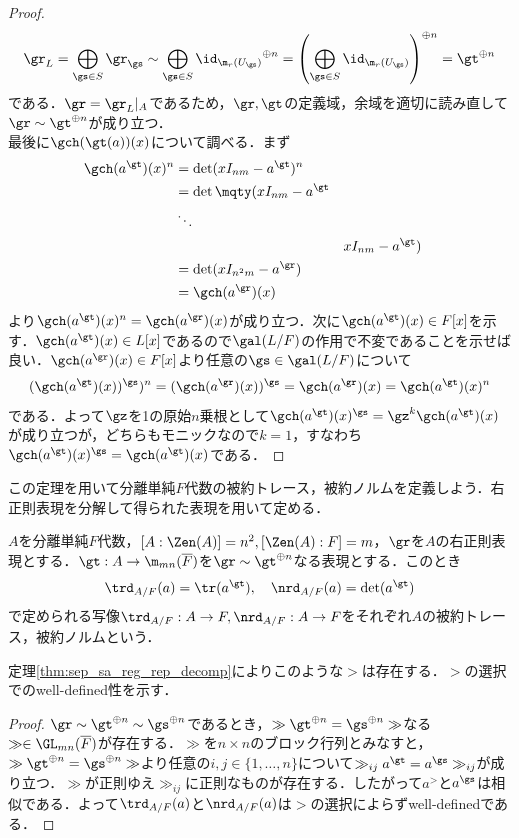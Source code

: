 \documentclass[a4paper,11pt]{jsarticle}
\begin{document}
\begin{proof}
  \[
    \gr_L=\bigoplus_{\gs\in S}\gr_\gs\sim\bigoplus_{\gs\in S} {\id_{\m_r(U_\gs)}}^{\oplus n}=\left(\bigoplus_{\gs\in S}\id_{\m_r(U_\gs)}\right)^{\oplus n}=\gt^{\oplus n}
  \]
  である．$\gr=\gr_L|_A$であるため，$\gr,\gt$の定義域，余域を適切に読み直して$\gr\sim \gt^{\oplus n}$が成り立つ．\\
  最後に$\gch(\gt(a))(x)$について調べる．まず
  \begin{align*}
    \gch(a^\gt)(x)^n & =\det(xI_{nm} - a^\gt)^n          \\
                     & =\det\mqty(xI_{nm} - a^{\gt} &  & \\&\ddots&\\&&xI_{nm}-a^\gt)\\
                     & =\det(xI_{n^2m} - a^\gr)          \\
                     & =\gch(a^\gr)(x)
  \end{align*}
  より$\gch(a^\gt)(x)^n=\gch(a^\gr)(x)$が成り立つ．次に$\gch(a^\gt)(x)\in F[x]$を示す．$\gch(a^\gt)(x)\in L[x]$であるので$\gal(L/F)$の作用で不変であることを示せば良い．$\gch(a^\gr)(x)\in F[x]$より任意の$\gs\in \gal(L/F)$について
  \[
    (\gch(a^\gt)(x))^\gs)^n=(\gch(a^\gr)(x))^\gs=\gch(a^\gr)(x)=\gch(a^\gt)(x)^n
  \]
  である．よって$\gz$を1の原始$n$乗根として$\gch(a^\gt)(x)^\gs=\gz^k\gch(a^\gt)(x)$が成り立つが，どちらもモニックなので$k=1$，すなわち$\gch(a^\gt)(x)^\gs=\gch(a^\gt)(x)$である．
\end{proof}
この定理を用いて分離単純$F$代数の被約トレース，被約ノルムを定義しよう．右正則表現を分解して得られた表現を用いて定める．
\begin{dfn}
  $A$を分離単純$F$代数，$[A:\Zen(A)]=n^2, [\Zen(A):F]=m$，$\gr$を$A$の右正則表現とする．$\gt:A\to\m_{mn}(\overline{F})$を$\gr\sim \gt^{\oplus n}$なる表現とする．このとき
  \[
    \trd_{A/F}(a)=\tr(a^\gt),\quad\nrd_{A/F}(a)=\det(a^\gt)
  \]
  で定められる写像$\trd_{A/F}:A\to F,\nrd_{A/F}:A\to F$をそれぞれ$A$の被約トレース，被約ノルムという．
\end{dfn}
定理\ref{thm:sep_sa_reg_rep_decomp}によりこのような$\gt$は存在する．$\gt$の選択でのwell-defined性を示す．
\begin{proof}
  $\gr\sim\gt^{\oplus n}\sim\gs^{\oplus n}$であるとき，$\gg\gt^{\oplus n}=\gs^{\oplus n}\gg$なる$\gg\in\GL_{mn}(\overline{F})$が存在する．$\gg$を$n\times n$のブロック行列とみなすと，$\gg\gt^{\oplus n}=\gs^{\oplus n}\gg$より任意の$i,j\in\{1,\ldots,n\}$について$\gg_{ij}a^\gt=a^\gs\gg_{ij}$が成り立つ．$\gg$が正則ゆえ$\gg_{ij}$に正則なものが存在する．したがって$a^\gt$と$a^\gs$は相似である．よって$\trd_{A/F}(a)$と$\nrd_{A/F}(a)$は$\gt$の選択によらずwell-definedである．
\end{proof}
\end{document}
